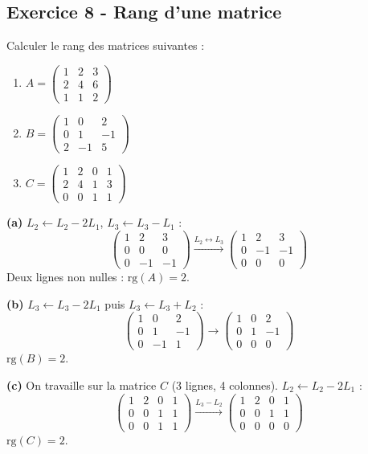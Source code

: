 \documentclass[12pt,a4paper]{article}
\begin{document}
\subsection*{Exercice 8 - Rang d'une matrice \niveau{\moyen}}

\begin{boiteexercice}
Calculer le rang des matrices suivantes :
\begin{enumerate}[label=(\alph*)]
  \item $A = \begin{pmatrix}1&2&3\\2&4&6\\1&1&2\end{pmatrix}$
  \item $B = \begin{pmatrix}1&0&2\\0&1&-1\\2&-1&5\end{pmatrix}$
  \item $C = \begin{pmatrix}1&2&0&1\\2&4&1&3\\0&0&1&1\end{pmatrix}$
\end{enumerate}
\end{boiteexercice}

\begin{boitecorrige}
\textbf{(a)} $L_2 \leftarrow L_2 - 2L_1$, $L_3 \leftarrow L_3 - L_1$ :
\[
\begin{pmatrix}1&2&3\\0&0&0\\0&-1&-1\end{pmatrix}
\xrightarrow{L_2\leftrightarrow L_3}
\begin{pmatrix}1&2&3\\0&-1&-1\\0&0&0\end{pmatrix}
\]
Deux lignes non nulles : $\text{rg}(A) = 2$.

\textbf{(b)} $L_3 \leftarrow L_3 - 2L_1$ puis $L_3 \leftarrow L_3 + L_2$ :
\[
\begin{pmatrix}1&0&2\\0&1&-1\\0&-1&1\end{pmatrix}
\to
\begin{pmatrix}1&0&2\\0&1&-1\\0&0&0\end{pmatrix}
\]
$\text{rg}(B) = 2$.

\textbf{(c)} On travaille sur la matrice $C$ (3 lignes, 4 colonnes). $L_2 \leftarrow L_2 - 2L_1$ :
\[
\begin{pmatrix}1&2&0&1\\0&0&1&1\\0&0&1&1\end{pmatrix}
\xrightarrow{L_3 - L_2}
\begin{pmatrix}1&2&0&1\\0&0&1&1\\0&0&0&0\end{pmatrix}
\]
$\text{rg}(C) = 2$.
\end{boitecorrige}
\end{document}

